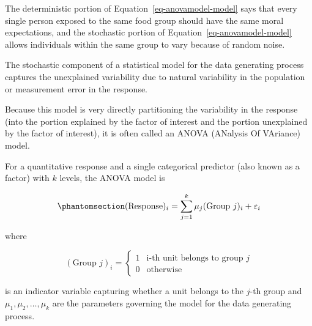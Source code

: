 \documentclass[
  letterpaper,
  DIV=11,
  numbers=noendperiod]{scrreprt}
\theoremstyle{plain}
\theoremstyle{definition}
\theoremstyle{definition}
\theoremstyle{remark}
\begin{document}
The deterministic portion of Equation~\ref{eq-anovamodel-model} says
that every single person exposed to the same food group should have the
same moral expectations, and the stochastic portion of
Equation~\ref{eq-anovamodel-model} allows individuals within the same
group to vary because of random noise.

\begin{tcolorbox}[enhanced jigsaw, breakable, titlerule=0mm, colframe=quarto-callout-tip-color-frame, bottomtitle=1mm, opacityback=0, rightrule=.15mm, toptitle=1mm, arc=.35mm, bottomrule=.15mm, left=2mm, title=\textcolor{quarto-callout-tip-color}{\faLightbulb}\hspace{0.5em}{Big Idea}, leftrule=.75mm, coltitle=black, toprule=.15mm, colbacktitle=quarto-callout-tip-color!10!white, colback=white, opacitybacktitle=0.6]

The stochastic component of a statistical model for the data generating
process captures the unexplained variability due to natural variability
in the population or measurement error in the response.

\end{tcolorbox}

Because this model is very directly partitioning the variability in the
response (into the portion explained by the factor of interest and the
portion unexplained by the factor of interest), it is often called an
ANOVA (ANalysis Of VAriance) model.

\begin{tcolorbox}[enhanced jigsaw, breakable, titlerule=0mm, colframe=quarto-callout-important-color-frame, bottomtitle=1mm, opacityback=0, rightrule=.15mm, toptitle=1mm, arc=.35mm, bottomrule=.15mm, left=2mm, title=\textcolor{quarto-callout-important-color}{\faExclamation}\hspace{0.5em}{ANOVA Model}, leftrule=.75mm, coltitle=black, toprule=.15mm, colbacktitle=quarto-callout-important-color!10!white, colback=white, opacitybacktitle=0.6]

For a quantitative response and a single categorical predictor (also
known as a factor) with \(k\) levels, the ANOVA model is

\begin{equation}\phantomsection\label{eq-anova}{(\text{Response})_i = \sum_{j = 1}^{k} \mu_j (\text{Group } j)_i + \varepsilon_i}\end{equation}

where

\[(\text{Group } j)_i = \begin{cases} 1 & \text{i-th unit belongs to group } j \\ 0 & \text{otherwise} \end{cases}\]

is an indicator variable capturing whether a unit belongs to the
\(j\)-th group and \(\mu_1, \mu_2, \dotsc, \mu_k\) are the parameters
governing the model for the data generating process.

\end{tcolorbox}
\end{document}
